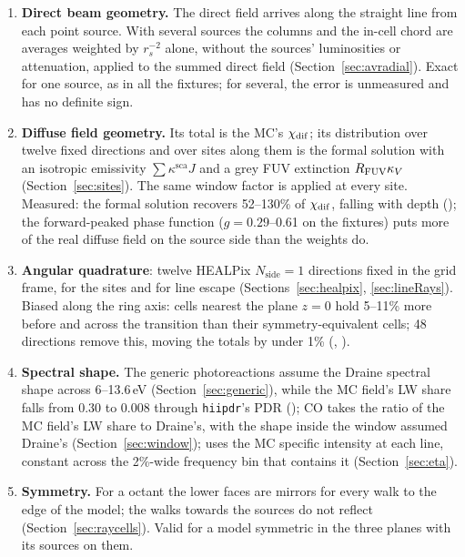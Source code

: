 \begin{enumerate}
  assumes that a photon's history is represented by the one site it is
  assigned to.
\item \textbf{Direct beam geometry.} The direct field arrives along the straight
  line from each point source. With several sources the columns and the
  in-cell chord are averages weighted by $r_s^{-2}$ alone, without the sources'
  luminosities or attenuation, applied to the summed direct field
  (Section~\ref{sec:avradial}). Exact for one source, as in all the fixtures;
  for several, the error is unmeasured and has no definite sign.
\item \textbf{Diffuse field geometry.} Its total is the MC's $\chi_{\mathrm{dif}}$; its
  distribution over twelve fixed directions and over sites along them is the
  formal solution with an isotropic emissivity $\sum\kappa^{\mathrm{sca}}J$ and a
  grey FUV extinction $R_{\mathrm{FUV}}\kappa_V$ (Section~\ref{sec:sites}). The same window
  factor is applied at every site. Measured: the formal solution recovers
  52--130\% of $\chi_{\mathrm{dif}}$, falling with depth (); the forward-peaked phase
  function ($g=0.29$--0.61 on the fixtures) puts more of the real diffuse field
  on the source side than the weights do.
\item \textbf{Angular quadrature}: twelve HEALPix $N_{\mathrm{side}}=1$
  directions fixed in the grid frame, for the sites and for line escape
  (Sections~\ref{sec:healpix}, \ref{sec:lineRays}). Biased along the ring axis:
  cells nearest the plane $z=0$ hold 5--11\% more \Htwo{} before and across the
  transition than their symmetry-equivalent cells; 48 directions remove this,
  moving the totals by under 1\% (, ).
\item \textbf{Spectral shape.} The generic photoreactions assume the Draine
  spectral shape across 6--13.6\,eV (Section~\ref{sec:generic}), while the MC
  field's LW share falls from 0.30 to 0.008 through \texttt{hiipdr}'s PDR
  (); CO takes the ratio of the MC field's LW share to Draine's,
  with the shape inside the window assumed Draine's (Section~\ref{sec:window});
  \Htwo{} uses the MC specific intensity at each line, constant across the
  2\%-wide frequency bin that contains it (Section~\ref{sec:eta}).
\item \textbf{Symmetry.} For a  octant the lower faces are
  mirrors for every walk to the edge of the model; the walks towards the
  sources do not reflect (Section~\ref{sec:raycells}). Valid for a model
  symmetric in the three planes with its sources on them.
\end{enumerate}

